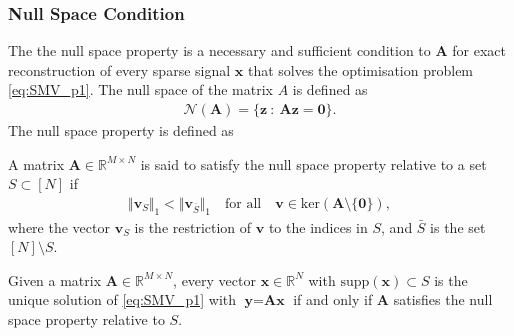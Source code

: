 \subsubsection{Null Space Condition}
The the null space property is a necessary and sufficient condition to $\mathbf{A}$ for exact reconstruction of every sparse signal $\textbf{x}$ that solves the optimisation problem \eqref{eq:SMV_p1}\cite[p. 77]{FR}. The null space of the matrix $A$ is defined as
\begin{align*}
\mathcal{N}(\mathbf{A}) = \{ \mathbf{z} \ : \ \mathbf{Az} = \textbf{0} \}.
\end{align*} 
The null space property is defined as
\begin{definition}
A matrix $\mathbf{A} \in \mathbb{R}^{M \times N}$ is said to satisfy the null space property relative to a set $S \subset [N]$ if
\begin{align}
\Vert \textbf{v}_S \Vert_1 < \Vert \textbf{v}_{\overline{S}} \Vert_1 \quad \text{for all} \quad \textbf{v} \in \text{ker}(\mathbf{A} \setminus \lbrace \textbf{0} \rbrace),
\end{align}
where the vector $\mathbf{v}_S$ is the restriction of $\mathbf{v}$ to the indices in $S$, and $\bar{S}$ is the set $[N]\setminus S$. 
\end{definition}
\begin{theorem}
Given a matrix $\textbf{A} \in \mathbb{R}^{M \times N}$, every vector $\textbf{x} \in \mathbb{R}^N$ with $\text{supp}(\textbf{x})\subset S$ is the unique solution of \eqref{eq:SMV_p1} with $\textbf{y} = \textbf{Ax}$ if and only if $\textbf{A}$ satisfies the null space property relative to $S$.
\end{theorem}
